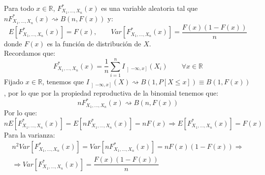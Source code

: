 \begin{ejercicio}
    Para todo $x\in \mathbb{R}$, $F_{X_1, \ldots, X_n}^\ast(x)$ es una variable aleatoria tal que \newline $nF_{X_1, \ldots, X_n}^\ast(x) \rightsquigarrow B(n,F(x))$ y:
    \begin{equation*}
        E[F_{X_1, \ldots, X_n}^\ast (x)] = F(x), \qquad Var[F_{X_1, \ldots, X_n}^\ast (x)] = \dfrac{F(x)(1-F(x))}{n}
    \end{equation*}
    donde $F(x)$ es la función de distribución de $X$.\\

    \noindent
    Recordamos que:
    \begin{equation*}
    F_{X_1, \ldots, X_n}^\ast (x) = \dfrac{1}{n}\sum\limits_{i=1}^{n}I_{\left]-\infty,x\right]}(X_i) \qquad \forall x\in \mathbb{R}
    \end{equation*}
Fijado $x\in \mathbb{R}$, tenemos que $I_{\left]-\infty,x\right]}(X)\rightsquigarrow B(1,P[X\leq x]) \equiv B(1,F(x))$, por lo que por la propiedad reproductiva de la binomial tenemos que:
    \begin{equation*}
        nF_{X_1, \ldots, X_n}^\ast (x) \rightsquigarrow B(n,F(x))
    \end{equation*}
    Por lo que:
    \begin{equation*}
        nE[F_{X_1, \ldots, X_n}^\ast (x)] = E[nF_{X_1, \ldots, X_n}^\ast (x)] = nF(x)
        \Longrightarrow
        E[F_{X_1, \ldots, X_n}^\ast (x)] = F(x)
    \end{equation*}
    Para la varianza:
    \begin{multline*}
        n^2Var[F_{X_1, \ldots, X_n}^\ast (x)] = Var[nF_{X_1, \ldots, X_n}^\ast (x)] = nF(x)(1-F(x))
        \Longrightarrow \\ \Longrightarrow
        Var[F_{X_1, \ldots, X_n}^\ast (x)] = \dfrac{F(x)(1-F(x))}{n}
    \end{multline*}
\end{ejercicio}

